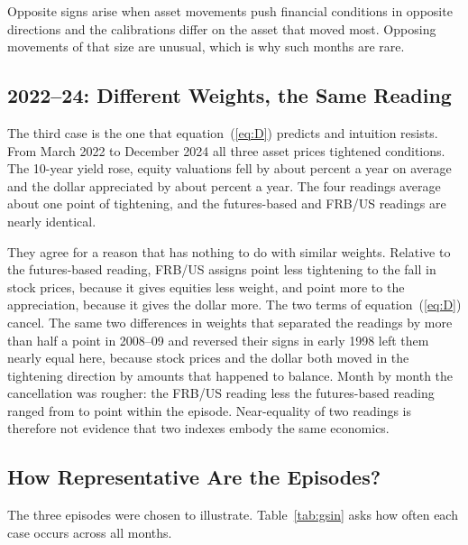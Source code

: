 

Opposite signs arise when asset movements push financial conditions in opposite directions and the calibrations differ on the asset that moved most. Opposing movements of that size are unusual, which is why such months are rare.

\subsection{2022--24: Different Weights, the Same Reading}\label{sec:recent}
The third case is the one that equation~(\ref{eq:D}) predicts and intuition resists. From March 2022 to December 2024 all three asset prices tightened conditions. The 10-year yield rose, equity valuations fell by about  percent a year on average and the dollar appreciated by about  percent a year. The four readings average about one point of tightening, and the futures-based and FRB/US readings are nearly identical.

They agree for a reason that has nothing to do with similar weights. Relative to the futures-based reading, FRB/US assigns  point less tightening to the fall in stock prices, because it gives equities less weight, and  point more to the appreciation, because it gives the dollar more. The two terms of equation~(\ref{eq:D}) cancel. The same two differences in weights that separated the readings by more than half a point in 2008--09 and reversed their signs in early 1998 left them nearly equal here, because stock prices and the dollar both moved in the tightening direction by amounts that happened to balance. Month by month the cancellation was rougher: the FRB/US reading less the futures-based reading ranged from  to  point within the episode. Near-equality of two readings is therefore not evidence that two indexes embody the same economics.

\subsection{How Representative Are the Episodes?}\label{sec:fullhist}
The three episodes were chosen to illustrate. Table~\ref{tab:gsin} asks how often each case occurs across all  months.



